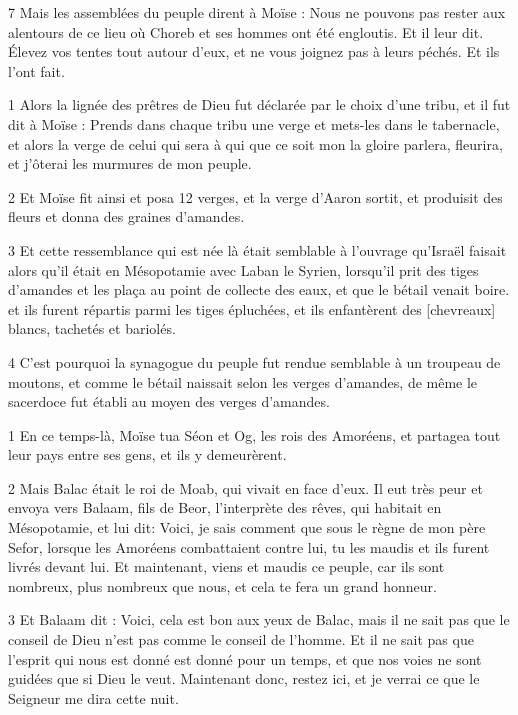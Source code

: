 \par 7 Mais les assemblées du peuple dirent à Moïse : Nous ne pouvons pas rester aux alentours de ce lieu où Choreb et ses hommes ont été engloutis. Et il leur dit. Élevez vos tentes tout autour d'eux, et ne vous joignez pas à leurs péchés. Et ils l’ont fait.


\par 1 Alors la lignée des prêtres de Dieu fut déclarée par le choix d'une tribu, et il fut dit à Moïse : Prends dans chaque tribu une verge et mets-les dans le tabernacle, et alors la verge de celui qui sera à qui que ce soit mon la gloire parlera, fleurira, et j'ôterai les murmures de mon peuple.

\par 2 Et Moïse fit ainsi et posa 12 verges, et la verge d'Aaron sortit, et produisit des fleurs et donna des graines d'amandes.

\par 3 Et cette ressemblance qui est née là était semblable à l'ouvrage qu'Israël faisait alors qu'il était en Mésopotamie avec Laban le Syrien, lorsqu'il prit des tiges d'amandes et les plaça au point de collecte des eaux, et que le bétail venait boire. et ils furent répartis parmi les tiges épluchées, et ils enfantèrent des [chevreaux] blancs, tachetés et bariolés.

\par 4 C'est pourquoi la synagogue du peuple fut rendue semblable à un troupeau de moutons, et comme le bétail naissait selon les verges d'amandes, de même le sacerdoce fut établi au moyen des verges d'amandes.


\par 1 En ce temps-là, Moïse tua Séon et Og, les rois des Amoréens, et partagea tout leur pays entre ses gens, et ils y demeurèrent.

\par 2 Mais Balac était le roi de Moab, qui vivait en face d'eux. Il eut très peur et envoya vers Balaam, fils de Beor, l'interprète des rêves, qui habitait en Mésopotamie, et lui dit: Voici, je sais comment que sous le règne de mon père Sefor, lorsque les Amoréens combattaient contre lui, tu les maudis et ils furent livrés devant lui. Et maintenant, viens et maudis ce peuple, car ils sont nombreux, plus nombreux que nous, et cela te fera un grand honneur.

\par 3 Et Balaam dit : Voici, cela est bon aux yeux de Balac, mais il ne sait pas que le conseil de Dieu n'est pas comme le conseil de l'homme. Et il ne sait pas que l'esprit qui nous est donné est donné pour un temps, et que nos voies ne sont guidées que si Dieu le veut. Maintenant donc, restez ici, et je verrai ce que le Seigneur me dira cette nuit.

